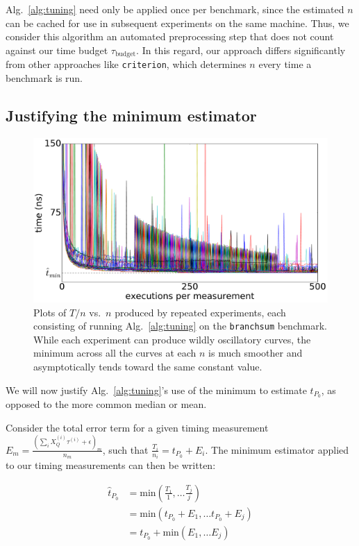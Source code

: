 \documentclass[conference]{IEEEtran}
\begin{document}
Alg.~\ref{alg:tuning} need only be applied once per benchmark, since the
estimated $n$ can be cached for use in subsequent experiments on the same
machine. Thus, we consider this algorithm an automated preprocessing step that
does not count against our time budget $\tau_{\textrm{budget}}$. In this
regard, our approach differs significantly from other approaches like
\lstinline|criterion|, which
determines $n$ every time a benchmark is run.

\subsection{Justifying the minimum estimator}
\label{sec:minimum}

\begin{figure}
\centering
\includegraphics[width=\columnwidth]{figures/fig2/linear_scan_branchsum}
\caption{Plots of $T/n$ vs.\ $n$ produced by repeated experiments, each
consisting of running Alg.~\ref{alg:tuning} on the \lstinline|branchsum|
benchmark. While each experiment can produce wildly oscillatory curves, the
minimum across all the curves at each $n$ is much smoother and asymptotically
tends toward the same constant value.}
\label{fig:scaling}
\end{figure}

We will now justify Alg.~\ref{alg:tuning}'s use of the minimum to estimate $t_{P_0}$, as
opposed to the more common median or mean.

Consider the total error term for a given timing measurement $E_m = \frac{\left(\sum_{i}
X_Q^{(i)} \tau^{(i)} + \epsilon \right)_m}{n_m}$, such that $\frac{T_i}{n_i} = t_{P_0} +
E_i$. The minimum estimator applied to our timing measurements can then be written:

\begin{align}
    \hat{t}_{P_0} &= \textrm{min}(\frac{T_1}{1}, \dots \frac{T_j}{j}) \\ \nonumber
                  &= \textrm{min}(t_{P_0} + E_1, \dots t_{P_0} + E_j) \\ \nonumber
                  &= t_{P_0} + \textrm{min}(E_1, \dots E_j) \\ \nonumber
\end{align}
\end{document}
